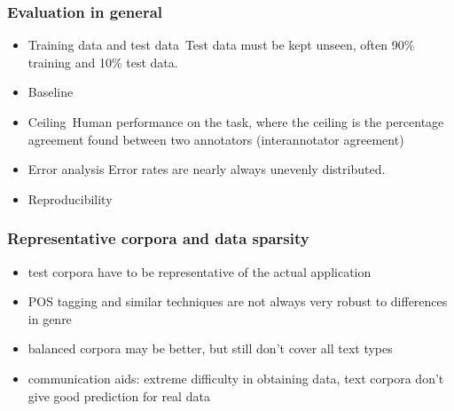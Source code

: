 \documentclass{beamer}
\newcommand{\newterm}[1]{{\alert{#1}}}
\begin{document}
\begin{frame}
\frametitle{Evaluation in general}
\begin{itemize}
\item \newterm{Training data and test data}\   Test data must be
kept unseen, often 90\% training and 10\% test data.
\item \newterm{Baseline} 
\item \newterm{Ceiling}\ 
Human performance on the task, where the ceiling is the
percentage agreement found between two annotators
(\newterm{interannotator agreement})
\item \newterm{Error analysis} Error rates are nearly always 
unevenly distributed.
\item \newterm{Reproducibility} 
\end{itemize}

\end{frame} 

\begin{frame}
\frametitle{Representative corpora and data sparsity}

\begin{itemize}
\item test corpora have to be representative of the actual application
\item POS tagging and similar techniques are not 
always very robust to differences in genre
\item balanced corpora may be better, but still
don't cover all text types
\item communication aids: extreme difficulty in obtaining data, text corpora
don't give good prediction for real data
\end{itemize}
\end{frame}
 
\end{document}
